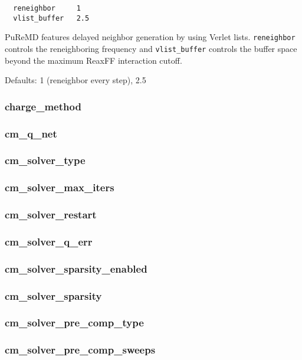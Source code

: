 \documentclass{article}
\begin{document}
\begin{verbatim}
  reneighbor     1
  vlist_buffer   2.5
\end{verbatim}
PuReMD features delayed neighbor generation by using Verlet lists. 
{\tt reneighbor} controls the reneighboring frequency and {\tt vlist\_buffer} 
controls the buffer space beyond the maximum ReaxFF interaction cutoff. 

Defaults: 1 (reneighbor every step), 2.5

\subsubsection{charge\_method}
\label{sec:charge_method}
\subsubsection{cm\_q\_net}
\label{sec:cm_q_net}
\subsubsection{cm\_solver\_type}
\label{sec:cm_solver_type}
\subsubsection{cm\_solver\_max\_iters}
\label{sec:cm_solver_max_iters}
\subsubsection{cm\_solver\_restart}
\label{sec:cm_solver_restart}
\subsubsection{cm\_solver\_q\_err}
\label{sec:cm_solver_q_err}
\subsubsection{cm\_solver\_sparsity\_enabled}
\label{sec:cm_solver_sparsity_enabled}
\subsubsection{cm\_solver\_sparsity}
\label{sec:cm_solver_sparsity}
\subsubsection{cm\_solver\_pre\_comp\_type}
\label{sec:cm_solver_pre_comp_type}
\subsubsection{cm\_solver\_pre\_comp\_sweeps}
\label{sec:cm_solver_pre_comp_sweeps}
\end{document}
